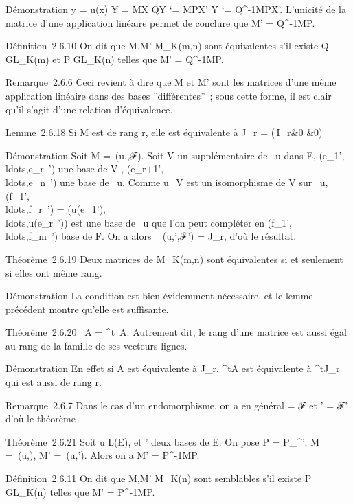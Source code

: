 \documentclass[]{article}
\begin{document}
Démonstration y = u(x) \Leftrightarrow Y = MX
\Leftrightarrow QY `= MPX' \mathrel\Leftrightarrow Y
`= Q^-1MPX'. L'unicité de la matrice d'une application
linéaire permet de conclure que M' = Q^-1MP.

Définition~2.6.10 On dit que M,M' \in M_K(m,n) sont équivalentes
s'il existe Q \in GL_K(m) et P \in GL_K(n) telles que M' =
Q^-1MP.

Remarque~2.6.6 Ceci revient à dire que M et M' sont les matrices d'une
même application linéaire dans des bases ''différentes''~; sous cette
forme, il est clair qu'il s'agit d'une relation d'équivalence.

Lemme~2.6.18 Si M est de rang r, elle est équivalente à J_r =
\left
(\matrix\,I_r&0
 &0\right )

Démonstration Soit M =\
\mathrmMat (u,,ℱ). Soit V un supplémentaire de
\mathrmKer~u dans E,
(e_1',\\ldots,e_r~')
une base de V ,
(e_r+1',\\ldots,e_n~')
une base de \mathrmKer~u.
Comme u_V  est un isomorphisme de V sur
\mathrmIm~u,
(f_1',\\ldots,f_r~')
=
(u(e_1'),\\ldots,u(e_r~'))
est une base de \mathrmIm~u
que l'on peut compléter en
(f_1',\\ldots,f_m~')
base de F. On a alors
\mathrmMat~ (u,',ℱ') =
J_r, d'où le résultat.

Théorème~2.6.19 Deux matrices de M_K(m,n) sont équivalentes si
et seulement si elles ont même rang.

Démonstration La condition est bien évidemment nécessaire, et le lemme
précédent montre qu'elle est suffisante.

Théorème~2.6.20 \mathrmrg~A
= \mathrmrg^t~A.
Autrement dit, le rang d'une matrice est aussi égal au rang de la
famille de ses vecteurs lignes.

Démonstration En effet si A est équivalente à J_r,
^tA est équivalente à ^tJ_r qui est aussi
de rang r.

Remarque~2.6.7 Dans le cas d'un endomorphisme, on a en général  = ℱ et
\mathcal{E}' = ℱ' d'où le théorème

Théorème~2.6.21 Soit u \in L(E),  et ' deux bases de E. On pose P =
P_\mathcal{E}^\mathcal{E}', M =\
\mathrmMat (u,), M' =\
\mathrmMat (u,\mathcal{E}'). Alors on a M' =
P^-1MP.

Définition~2.6.11 On dit que M,M' \in M_K(n) sont semblables s'il
existe P \in GL_K(n) telles que M' = P^-1MP.
\end{document}
